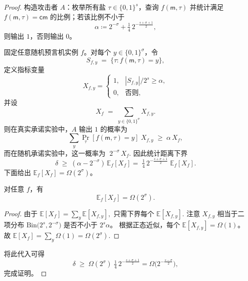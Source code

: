 \documentclass[american,singlepageview]{snargs-book-zh}
\newcommand{\Bits}{\{0,1\}}
\newcommand{\DefineEqual}{\coloneqq}
\newcommand{\Expectation}{\mathbb{E}}
\newcommand{\ProtoAdversary}{A}
\newcommand{\ProtoSalt}{\tau}
\newcommand{\ROFunction}{f}
\newcommand{\ROAnswer}{y}
\newcommand{\ROOutputSize}{\sigma}
\newcommand{\CMSaltSize}{s}
\newcommand{\CMCommitment}{\mathsf{cm}}
\newcommand{\CMMessage}{\mathsf{m}}
\newcommand{\CMSaltString}{\ProtoSalt}
\newcommand{\CMAdversary}{\ProtoAdversary}
\begin{document}
\begin{proof}
构造攻击者 $\CMAdversary$：枚举所有盐 $\CMSaltString\in\Bits^{\CMSaltSize}$，查询
\(\ROFunction(\CMMessage,\CMSaltString)\)
并统计满足
\(\ROFunction(\CMMessage,\CMSaltString)=\CMCommitment\)
的比例；若该比例不小于
\[
\alpha \DefineEqual 2^{-\ROOutputSize}
  + \tfrac14\,2^{-\tfrac{\CMSaltSize+\ROOutputSize+1}{2}},
\]
则输出 \(1\)，否则输出 \(0\)。

固定任意随机预言机实例 $\ROFunction$。对每个 $\ROAnswer\in\Bits^{\ROOutputSize}$，令
\[
S_{\ROFunction,\ROAnswer}
\;=\;
\{\CMSaltString:\ROFunction(\CMMessage,\CMSaltString)=\ROAnswer\},
\]
定义指标变量
\[
X_{\ROFunction,\ROAnswer}
=
\begin{cases}
1,&|S_{\ROFunction,\ROAnswer}|/2^{\CMSaltSize}\ge\alpha,\\
0,&\text{否则},
\end{cases}
\]
并设
\[
X_{\ROFunction}
\;=\;
\sum_{\ROAnswer\in\Bits^{\ROOutputSize}}
  X_{\ROFunction,\ROAnswer}.
\]
则在真实承诺实验中，$\CMAdversary$ 输出 $1$ 的概率为
\[
\sum_{\ROAnswer}
  \Pr_{\CMSaltString}[\ROFunction(\CMMessage,\CMSaltString)=\ROAnswer]
  \;X_{\ROFunction,\ROAnswer}
\;\ge\;\alpha\,X_{\ROFunction},
\]
而在随机承诺实验中，这一概率为
\(\;2^{-\ROOutputSize}\,X_{\ROFunction}.\)
因此统计距离下界
\[
\delta\;\ge\;(\alpha-2^{-\ROOutputSize})\,
\Expectation_{\ROFunction}[X_{\ROFunction}]
=\;\tfrac14\,2^{-\tfrac{\CMSaltSize+\ROOutputSize+1}{2}}\;
\Expectation_{\ROFunction}[X_{\ROFunction}].
\]
下面给出
\(\Expectation_{\ROFunction}[X_{\ROFunction}]=\Omega(2^{\ROOutputSize})\)。

\begin{claim}
\label{claim:cm-tightness-exp}
对任意 $\ROFunction$，有
\[
\Expectation_{\ROFunction}[X_{\ROFunction}]
=\Omega(2^{\ROOutputSize}).
\]
\end{claim}
\begin{proof}
由于
\(\Expectation[X_{\ROFunction}]
=\sum_{\ROAnswer}\Expectation[X_{\ROFunction,\ROAnswer}],\)
只需下界每个
\(\Expectation[X_{\ROFunction,\ROAnswer}]\).
注意
\(X_{\ROFunction,\ROAnswer}\)
相当于二项分布
\(\mathrm{Bin}\bigl(2^{\CMSaltSize},2^{-\ROOutputSize}\bigr)\)
是否不小于
\(2^{\CMSaltSize}\alpha\)。
根据正态近似，每个
\(\Expectation[X_{\ROFunction,\ROAnswer}]=\Omega(1)\)。
故
\(\Expectation[X_{\ROFunction}]
=\sum_{\ROAnswer}\Omega(1)
=\Omega(2^{\ROOutputSize}).\)
\end{proof}

将此代入可得
\[
\delta
\;\ge\;
\Omega(2^{\ROOutputSize})\;\tfrac14\,2^{-\tfrac{\CMSaltSize+\ROOutputSize+1}{2}}
=\Omega\!\bigl(2^{-\tfrac{\CMSaltSize-\ROOutputSize}{2}}\bigr),
\]
完成证明。
\end{proof}
\end{document}
